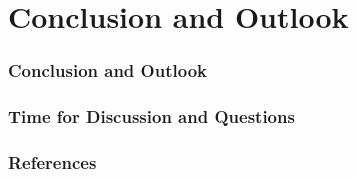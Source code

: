 \documentclass{beamer}
\begin{document}
\section{Conclusion and Outlook}
\begin{frame}
    \frametitle{Conclusion and Outlook}
\end{frame}

\begin{frame}
    \frametitle{Time for Discussion and Questions}
\end{frame}
\begin{frame}
    \frametitle{References}
    \printbibliography
\end{frame}
\end{document}
